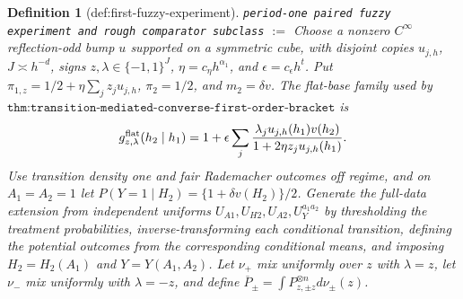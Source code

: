 \documentclass{article}
\newtheorem{definition}{Definition}
\begin{document}
\begin{definition}[def:first-fuzzy-experiment]\label{def:first-fuzzy-experiment}
\texttt{period-one paired fuzzy experiment and rough comparator subclass} $:=$ Choose a nonzero \(C^\infty\) reflection-odd bump \(u\) supported on a symmetric cube, with disjoint copies \(u_{j,h}\), \(J\asymp h^{-d}\), signs \(z,\lambda\in\{-1,1\}^J\), \(\eta=c_\eta h^{\alpha_1}\), and \(\epsilon=c_\epsilon h^t\). Put \(\pi_{1,z}=1/2+\eta\sum_jz_ju_{j,h}\), \(\pi_2=1/2\), and \(m_2=\delta v\). The flat-base family used by \(\texttt{thm:transition-mediated-converse-first-order-bracket}\) is
\[
g^{\rm flat}_{z,\lambda}(h_2\mid h_1)
=1+\epsilon\sum_j\frac{\lambda_ju_{j,h}(h_1)v(h_2)}
 {1+2\eta z_ju_{j,h}(h_1)}.
\]
Use transition density one and fair Rademacher outcomes off regime, and on \(A_1=A_2=1\) let \(P(Y=1\mid H_2)=\{1+\delta v(H_2)\}/2\). Generate the full-data extension from independent uniforms \(U_{A1},U_{H2},U_{A2},U_Y^{a_1a_2}\) by thresholding the treatment probabilities, inverse-transforming each conditional transition, defining the potential outcomes from the corresponding conditional means, and imposing \(H_2=H_2(A_1)\) and \(Y=Y(A_1,A_2)\). Let \(\nu_+\) mix uniformly over \(z\) with \(\lambda=z\), let \(\nu_-\) mix uniformly with \(\lambda=-z\), and define \(\overline P_\pm=\int P_{z,\pm z}^{\otimes n}d\nu_\pm(z)\).


\end{definition}
\end{document}
